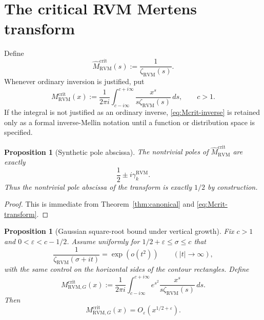 \documentclass[11pt,reqno]{amsart}
\newtheorem{proposition}[theorem]{Proposition}
\theoremstyle{definition}
\theoremstyle{remark}
\newcommand{\eps}{\varepsilon}
\newcommand{\RVM}{\mathrm{RVM}}
\newcommand{\crit}{\mathrm{crit}}
\begin{document}
\section{The critical RVM Mertens transform}

Define
\begin{equation}\label{eq:Mcrit-transform}
 \widehat M_{\RVM}^{\crit}(s):=\frac1{\zeta_{\RVM}(s)}.
\end{equation}
Whenever ordinary inversion is justified, put
\begin{equation}\label{eq:Mcrit-inverse}
 M_{\RVM}^{\crit}(x)
 :=\frac1{2\pi i}\int_{c-i\infty}^{c+i\infty}
 \frac{x^s}{s\zeta_{\RVM}(s)}\,ds,
 \qquad c>1.
\end{equation}
If the integral is not justified as an ordinary inverse, \eqref{eq:Mcrit-inverse} is retained only as a formal inverse-Mellin notation until a function or distribution space is specified.

\begin{proposition}[Synthetic pole abscissa]\label{prop:Mcrit-poles}
The nontrivial poles of $\widehat M_{\RVM}^{\crit}$ are exactly
\begin{equation}
 \frac12\pm i\gamma_k^{\RVM}.
\end{equation}
Thus the nontrivial pole abscissa of the transform is exactly $1/2$ by construction.
\end{proposition}

\begin{proof}
This is immediate from Theorem~\ref{thm:canonical} and \eqref{eq:Mcrit-transform}.
\end{proof}

\begin{proposition}[Gaussian square-root bound under vertical growth]\label{prop:Gaussian}
Fix $c>1$ and $0<\eps<c-1/2$.  Assume uniformly for
$1/2+\eps\le\sigma\le c$ that
\begin{equation}\label{eq:subgaussian}
 \frac1{\zeta_{\RVM}(\sigma+it)}=\exp(o(t^2))
 \qquad(|t|\to\infty),
\end{equation}
with the same control on the horizontal sides of the contour rectangles.  Define
\begin{equation}\label{eq:MG}
 M_{\RVM,G}^{\crit}(x)
 :=\frac1{2\pi i}\int_{c-i\infty}^{c+i\infty}
 e^{s^2}\frac{x^s}{s\zeta_{\RVM}(s)}\,ds.
\end{equation}
Then
\begin{equation}\label{eq:MG-bound}
 M_{\RVM,G}^{\crit}(x)=O_\eps(x^{1/2+\eps}).
\end{equation}
\end{proposition}
\end{document}
